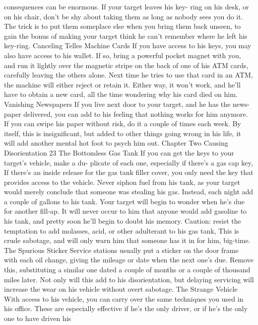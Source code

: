 \documentclass{book}
\begin{document}
consequences can be enormous. If your target leaves his key- 
ring on his desk, or on his chair, don't be shy about taking them 
as long as nobody sees you do it. The trick is to put them 
someplace else when you bring them back unseen, to gain the 
bonus of making your target think he can't remember where he 
left his key-ring. 
Canceling Telles Machine Cards 
If you have access to his keys, you may also have access to 
his wallet. If so, bring a powerful pocket magnet with you, and 
run it lightly over the magnetic stripe on the back of one of his 
ATM cards, carefully leaving the others alone. Next time he 
tries to use that card in an ATM, the machine will either reject 
or retain it. Either way, it won't work, and he'll have to obtain a 
new card, all the time wondering why his card died on him. 
Vanishing Newspapers 
If you live next door to your target, and he has the news- 
paper delivered, you can add to his feeling that nothing works 
for him anymore. If you can swipe his paper without risk, do it 
a couple of times each week. By itself, this is insignificant, but 
added to other things going wrong in his life, it will add another 
mental hot foot to psych him out. 
Chapter Two 
Causing Disorientation 
23 
The Bottomless Gas Tank 
If you can get the keys to your target's vehicle, make a du- 
plicate of each one, especially if there's a gas cap key, If there's 
an inside release for the gas tank filler cover, you only need the 
key that provides access to the vehicle. 
Never siphon fuel from his tank, as your target would 
merely conclude that someone was stealing his gas. Instead, 
each night add a couple of gallons to his tank. Your target will 
begin to wonder when he's due for another fill-ap. It will never 
occur to him that anyone would add gasoline to his tank, and 
pretty soon he'll begin to doubt his memory. 
Caution: resist the temptation to add molasses, acid, or 
other adulterant to his gas tank, This is crude sabotage, and will 
only warn him that someone has it in for him, big-time. 
The Spurious Sticker 
Service stations usually put a sticker on the door frame with 
each oil change, giving the mileage or date when the next one's 
due. Remove this, substituting a similar one dated a couple of 
months or a couple of thousand miles later. Not only will this 
add to his disorientation, but delaying servicing will increase 
the wear on his vehicle without overt sabotage. 
The Strange Vehicle 
With access to his vehicle, you can carry over the same 
techniques you used in his office. These are especially effective 
if he's the only driver, or if he's the only one to have driven his 
\end{document}
